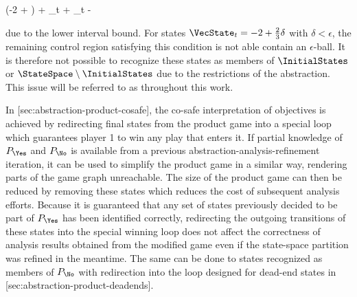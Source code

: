     \startformula
        \startalign[n=3,align={middle,right,left}]
            \NC \empty
             \Big({-2} +  \delta\Big) + \VecControl_t + 
            \NC \subseteq {}
            \NR
            \NC \Leftrightarrow \quad
            \NC {}
            \NC \subseteq {}
            \NR
            \NC \Rightarrow \quad
            \NC \VecControl_t
            \NC {} - \delta
            \NR
        \stopalign
    \stopformula

    due to the lower interval bound.
    For states $\VecState_t = -2 + \frac{2}{3} \delta$ with $\delta < \epsilon$, the remaining control region satisfying this condition is not able contain an $\epsilon$-ball.
    It is therefore not possible to recognize these states as members of $\InitialStates$ or $\StateSpace \setminus \InitialStates$ due to the restrictions of the abstraction.
    This issue will be referred to as  throughout this work.

\stopsubsection


\startsubsection[title={Product Game Simplification},reference=sec:abstraction-analysis-simplification]

    In [sec:abstraction-product-cosafe], the co-safe interpretation of objectives is achieved by redirecting final states from the product game into a special loop which guarantees player 1 to win any play that enters it.
    If partial knowledge of $P_\Yes$ and $P_\No$ is available from a previous abstraction-analysis-refinement iteration, it can be used to simplify the product game in a similar way, rendering parts of the game graph unreachable.
    The size of the product game can then be reduced by removing these states which reduces the cost of subsequent analysis efforts.
    Because it is guaranteed that any set of states previously decided to be part of $P_\Yes$ has been identified correctly, redirecting the outgoing transitions of these states into the special winning loop does not affect the correctness of analysis results obtained from the modified game even if the state-space partition was refined in the meantime.
    The same can be done to states recognized as members of $P_\No$ with redirection into the loop designed for dead-end states in [sec:abstraction-product-deadends].

